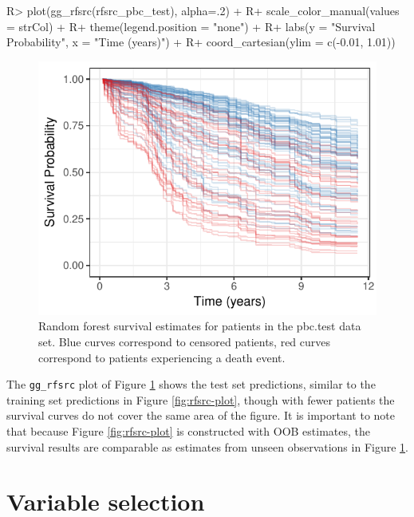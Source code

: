 \documentclass[article]{jss}
\begin{document}
\begin{Schunk}
\begin{Sinput}
R> plot(gg_rfsrc(rfsrc_pbc_test), alpha=.2) +
R+   scale_color_manual(values = strCol) +
R+   theme(legend.position = "none") +
R+   labs(y = "Survival Probability", x = "Time (years)") +
R+   coord_cartesian(ylim = c(-0.01, 1.01))
\end{Sinput}
\begin{figure}[!htb]

{\centering \includegraphics{fig-rfs/rfs-predictPlot-1} 

}

\caption[Random forest survival estimates for patients in the pbc.test data set]{Random forest survival estimates for patients in the pbc.test data set. Blue curves correspond to censored patients, red curves correspond to patients experiencing a death event.}\label{fig:predictPlot}
\end{figure}
\end{Schunk}

The \texttt{gg\_rfsrc} plot of Figure \ref{fig:predictPlot} shows the
test set predictions, similar to the training set predictions in Figure
\ref{fig:rfsrc-plot}, though with fewer patients the survival curves do
not cover the same area of the figure. It is important to note that
because Figure \ref{fig:rfsrc-plot} is constructed with OOB estimates,
the survival results are comparable as estimates from unseen
observations in Figure \ref{fig:predictPlot}.

\section{Variable selection}\label{variable-selection}
\end{document}
